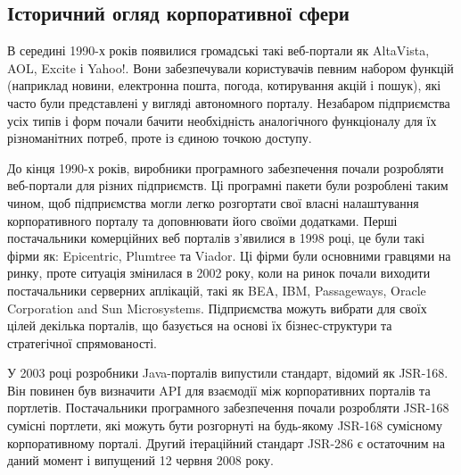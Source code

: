 \subsection{Історичний огляд корпоративної сфери}
В середині 1990-х років появилися громадські такі веб-портали як AltaVista, AOL, Excite і Yahoo!. 
Вони забезпечували користувачів певним набором функцій (наприклад новини, електронна пошта, погода, котирування акцій і пошук), які часто були представлені у вигляді автономного порталу.
Незабаром підприємства усіх типів і форм почали бачити необхідність аналогічного функціоналу для їх різноманітних потреб, проте із єдиною точкою доступу.
\par До кінця 1990-х років, виробники програмного забезпечення почали розробляти веб-портали для різних підприємств. 
Ці програмні пакети були розроблені таким чином, щоб підприємства могли легко розгортати свої власні налаштування корпоративного порталу та доповнювати його своїми додатками.
Перші постачальники комерційних веб порталів з'явилися в 1998 році, це були такі фірми як: Epicentric, Plumtree  та Viador. 
Ці фірми були основними гравцями на ринку, проте ситуація змінилася в 2002 року, коли на ринок почали виходити постачальники серверних аплікацій, такі як BEA, IBM, Passageways, Oracle Corporation and Sun Microsystems.
Підприємства можуть вибрати для своїх цілей декілька порталів, що базується на основі їх бізнес-структури та стратегічної спрямованості.
\par У 2003 році розробники Java-порталів випустили стандарт, відомий як JSR-168. 
Він повинен був визначити API для взаємодії між корпоративних порталів та портлетів.
Постачальники програмного забезпечення почали розробляти JSR-168 сумісні портлети, які можуть бути розгорнуті на будь-якому JSR-168 сумісному корпоративному порталі. 
Другий ітераційний стандарт JSR-286 є остаточним на даний момент і випущений 12 червня 2008 року.

